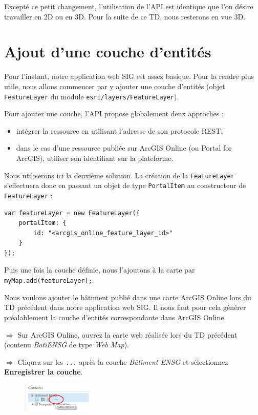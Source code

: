 \documentclass[11pt]{article}
\newcommand{\action}{$\Rightarrow$ }
\newcommand{\code}[1]{\lstinline{#1}}
\begin{document}
Excepté ce petit changement, l'utilisation de l'API est identique que l'on désire travailler en 2D ou en 3D. Pour la suite de ce TD, nous resterons en vue 3D.



\section{Ajout d'une couche d'entités}
Pour l'instant, notre application web SIG est assez basique. Pour la rendre plus utile, nous allons commencer par y ajouter une couche d'entités (objet \code{FeatureLayer} du module \code{esri/layers/FeatureLayer}).

Pour ajouter une couche, l'API propose globalement deux approches :
\begin{itemize}
	\item intégrer la ressource en utilisant l'adresse de son protocole REST;
	\item dans le cas d'une ressource publiée sur ArcGIS Online (ou Portal for ArcGIS), utiliser son identifiant sur la plateforme.
\end{itemize}

Nous utiliserons ici la deuxième solution. La création de la \code{FeatureLayer} s'effectuera donc en passant un objet de type \code{PortalItem} au constructeur de \code{FeatureLayer} :
\begin{lstlisting}
var featureLayer = new FeatureLayer({
	portalItem: {
		id: "<arcgis_online_feature_layer_id>"
	}
});
\end{lstlisting}

Puis une fois la couche définie, nous l'ajoutons à la carte par \code{myMap.add(featureLayer);}.

Nous voulons ajouter le bâtiment publié dans une carte ArcGIS Online lors du TD précédent dans notre application web SIG. Il nous faut pour cela générer préalablement la couche d'entités correspondante dans ArcGIS Online.

\action Sur ArcGIS Online, ouvrez la carte web réalisée lors du TD précédent (contenu \textit{BatiENSG} de type \textit{Web Map}).

\action Cliquez sur les \code{...} après la couche \textit{Bâtiment ENSG} et sélectionnez \textbf{Enregistrer la couche}.
\begin{figure}[H]
	\center \includegraphics[width=0.3\textwidth]{img/td2/ago_enregistrer_couche.png} \\
\end{figure}
\end{document}
